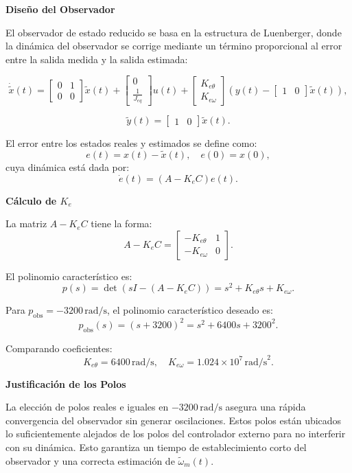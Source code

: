 \documentclass{article}
\begin{document}
\textbf{Diseño del Observador}

El observador de estado reducido se basa en la estructura de Luenberger, donde la dinámica del observador se corrige mediante un término proporcional al error entre la salida medida y la salida estimada:


\[
\dot{\tilde{x}}(t) = 
\begin{bmatrix}
0 & 1 \\ 
0 & 0
\end{bmatrix} 
\tilde{x}(t) + 
\begin{bmatrix}
0 \\ 
\frac{1}{J_{eq}}
\end{bmatrix} 
u(t) + 
\begin{bmatrix}
K_{e\theta} \\ 
K_{e\omega}
\end{bmatrix} 
\left( y(t) - 
\begin{bmatrix}
1 & 0
\end{bmatrix} 
\tilde{x}(t) \right),
\]

\[
\tilde{y}(t) = 
\begin{bmatrix}
1 & 0
\end{bmatrix} 
\tilde{x}(t).
\]


El error entre los estados reales y estimados se define como:
\[
e(t) = x(t) - \tilde{x}(t), \quad e(0) = x(0),
\]
cuya dinámica está dada por:
\[
\dot{e}(t) = \left( A - K_e C \right) e(t).
\]

\textbf{Cálculo de \( K_e \)}

La matriz \( A - K_e C \) tiene la forma:
\[
A - K_e C = \begin{bmatrix} 
-K_{e\theta} & 1 \\ 
-K_{e\omega} & 0 
\end{bmatrix}.
\]

El polinomio característico es:
\[
p(s) = \det\left(sI - (A - K_e C)\right) = s^2 + K_{e\theta}s + K_{e\omega}.
\]

Para \( p_{\text{obs}} = -3200 \, \text{rad/s} \), el polinomio característico deseado es:
\[
p_{\text{obs}}(s) = (s + 3200)^2 = s^2 + 6400s + 3200^2.
\]

Comparando coeficientes:
\[
K_{e\theta} = 6400 \, \text{rad/s}, \quad K_{e\omega} = 1.024 \times 10^7 \, \text{rad/s}^2.
\]

\textbf{Justificación de los Polos}

La elección de polos reales e iguales en \(-3200 \, \text{rad/s}\) asegura una rápida convergencia del observador sin generar oscilaciones. Estos polos están ubicados lo suficientemente alejados de los polos del controlador externo para no interferir con su dinámica. Esto garantiza un tiempo de establecimiento corto del observador y una correcta estimación de \(\tilde{\omega}_m(t)\).
\end{document}
